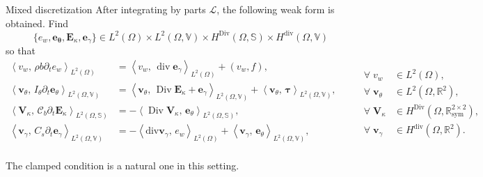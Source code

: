 \documentclass[aspectratio=169]{ISAE-Beamer}
\DeclareMathOperator*{\Div}{Div}
\renewcommand{\div}{\operatorname{div}}
\newcommand{\bbR}{\mathbb{R}}
\newcommand{\inner}[3][]{\ensuremath{\left\langle #2, \, #3 \right\rangle_{#1}}}
\begin{document}
\begin{frame}{Mixed discretization}
After integrating by parts $\mathcal{L}$, the following weak form is obtained. Find
$$\{e_w, \bm{e}_{\bm{\theta}}, \bm{E}_{\kappa}, \bm{e}_{\gamma}\} \in L^2(\Omega) \times L^2(\Omega, \mathbb{V}) \times H^{\Div}(\Omega, \mathbb{S}) \times H^{\div}(\Omega, \mathbb{V})$$
so that 
\begin{equation*}
\begin{aligned}
\inner[L^2(\Omega)]{v_w}{\rho b \partial_t {e}_w} &= \inner[L^2(\Omega)]{v_w}{\div \bm{e}_\gamma} + (v_w, f), \\ 
\inner[L^2(\Omega, \mathbb{V})]{\bm{v}_\theta}{I_\theta \partial_t {\bm{e}}_\theta} &= \inner[L^2(\Omega, \mathbb{V})]{\bm{v}_\theta}{\Div \bm{E}_\kappa + \bm{e}_\gamma} + \inner[L^2(\Omega, \mathbb{V})]{\bm{v}_\theta}{\bm{\tau}}, \\  
\inner[L^2(\Omega, \mathbb{S})]{\bm{V}_\kappa}{\bm{\mathcal{C}}_{b} \partial_t{\bm{E}}_\kappa} &= -\inner[L^2(\Omega, \mathbb{S})]{\Div \bm{V}_\kappa}{\bm{e}_\theta}, \\ 
\inner[L^2(\Omega, \mathbb{V})]{\bm{v}_\gamma}{C_s \partial_t{\bm{e}}_\gamma} &= -\inner[L^2(\Omega)]{\mathrm{div} \bm{v}_\gamma}{e_w} + \inner[L^2(\Omega, \mathbb{V})]{\bm{v}_\gamma}{\bm{e}_{\theta}}, \\ 
\end{aligned} \qquad
\begin{aligned}
\forall\; v_w &\in L^2(\Omega), \\
\forall\; \bm{v}_\theta &\in L^2(\Omega, \bbR^2), \\
\forall\; \bm{V}_\kappa &\in H^{\Div}(\Omega, \bbR^{2\times 2}_{\text{sym}}), \\
\forall\; \bm{v}_\gamma &\in H^{\div}(\Omega, \bbR^2).
\end{aligned}
\end{equation*}

The clamped condition is a natural one in this setting.
\end{frame}
\end{document}
